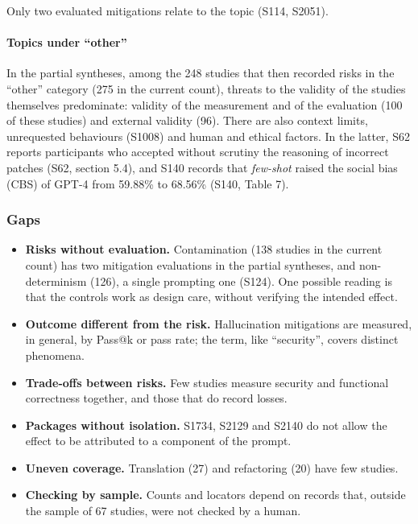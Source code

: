Only two evaluated mitigations relate to the topic (S114, S2051).

\paragraph{Topics under ``other''}
In the partial syntheses, among the 248 studies that then recorded risks in the ``other'' category (275 in the current
count), threats to the validity of the studies themselves predominate: validity of the measurement and of the evaluation (100 of these
studies) and external validity (96). There are also context limits, unrequested behaviours (S1008) and human and ethical factors.
In the latter, S62 reports participants who accepted without scrutiny the reasoning of incorrect patches (S62, section 5.4), and S140 records that \textit{few-shot} raised the social bias (CBS) of GPT-4 from 59.88\% to 68.56\% (S140, Table 7).

\subsubsection{Gaps}

\begin{itemize}
\item \textbf{Risks without evaluation.} Contamination (138 studies in the current count) has two mitigation evaluations in the
partial syntheses, and non-determinism (126), a single prompting one (S124). One possible reading is that the controls work as design care, without verifying the intended effect.
\item \textbf{Outcome different from the risk.} Hallucination mitigations are measured, in general, by Pass@k or pass rate; the term, like ``security'', covers distinct phenomena.
\item \textbf{Trade-offs between risks.} Few studies measure security and functional correctness together, and those that do record losses.
\item \textbf{Packages without isolation.} S1734, S2129 and S2140 do not allow the effect to be attributed to a component of the prompt.
\item \textbf{Uneven coverage.} Translation (27) and refactoring (20) have few studies.
\item \textbf{Checking by sample.} Counts and locators depend on records that, outside the sample of 67 studies, were not checked by a human.
\end{itemize}
